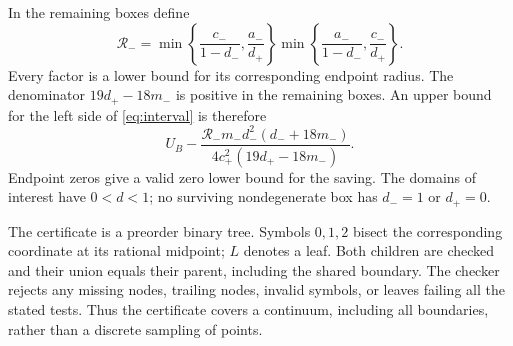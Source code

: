 \documentclass[12pt]{article}
\begin{document}
In the remaining boxes define
\[
 \mathcal R_-=
 \min\left\{\frac{c_-}{1-d_-},\frac{a_-}{d_+}\right\}
 \min\left\{\frac{a_-}{1-d_-},\frac{c_-}{d_+}\right\}.
\]
Every factor is a lower bound for its corresponding endpoint radius.
The denominator $19d_+-18m_-$ is positive in the remaining boxes.
An upper bound for the left side of \eqref{eq:interval} is therefore
\begin{equation}\label{eq:box}
 U_B-
 \frac{\mathcal R_-m_-d_-^2(d_-+18m_-)}{4c_+^2(19d_+-18m_-)}.
\end{equation}
Endpoint zeros give a valid zero lower bound for the saving. The domains
of interest have $0<d<1$; no surviving nondegenerate box has $d_-=1$
or $d_+=0$.

The certificate is a preorder binary tree. Symbols $0,1,2$ bisect the
corresponding coordinate at its rational midpoint; $L$ denotes a leaf.
Both children are checked and their union equals their parent, including
the shared boundary. The checker rejects any missing nodes, trailing
nodes, invalid symbols, or leaves failing all the stated tests.
Thus the certificate covers a continuum, including all boundaries,
rather than a discrete sampling of points.
\end{document}
